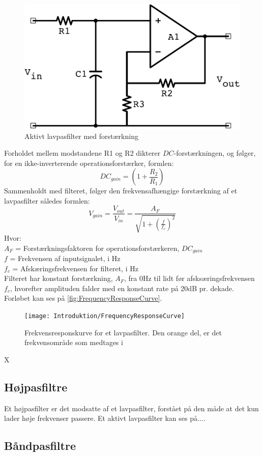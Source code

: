 %
\begin{figure}[H]
	\centering
	\includegraphics[resolution=300,scale=0.5]{Figure/Introduktion/ActiveLowPassGain.pdf}
	\caption{Aktivt lavpasfilter med forstærkning}
	\label{fig:ActiveLowPassGain}
\end{figure}
\noindent
%
Forholdet mellem modstandene R1 og R2 dikterer $DC$-forstærkningen, og følger, for en ikke-inverterende operationsforstærker, formlen:
%
\begin{equation} \label{eq:LowPassDCGain}
	DC_{gain}=\left(1+\frac{R_2}{R_1}\right)
\end{equation}
%
Sammenholdt med filteret, følger den frekvensafhængige forstærkning af et lavpasfilter således formlen:
%
\begin{equation} \label{LowPassFqVGain}
  V_{gain}=\frac{V_{out}}{V_{in}}=\frac{A_F}{\sqrt{1+\left(\frac{f}{f_c}\right)^2}}
\end{equation}
Hvor:\\
$A_F$ = Forstærkningsfaktoren for operationsforstærkeren, $DC_{gain}$\\
$f$ = Frekvensen af inputsignalet, i Hz\\
$f_c$ = Afskæringsfrekvensen for filteret, i Hz\\
Filteret har konstant forstærkning, $A_F$, fra 0Hz til lidt før afsksæringsfrekvensen $f_c$, hvorefter amplituden falder med en konstant rate på 20dB pr. dekade. Forløbet kan ses på \autoref{fig:FrequencyResponseCurve}.
%
\begin{figure}[H]
	\centering
	\texttt{[image: Introduktion/FrequencyResponseCurve]}
	\caption{Frekvensresponskurve for et lavpasfilter. Den orange del, er det frekvensområde som medtages i}
	\label{fig:FrequencyResponseCurve}
\end{figure}
\noindent
X
%
%
%
\subsection{Højpasfiltre}
\label{Hoejpasfiltre}
Et højpasfilter er det modsatte af et lavpasfilter, forstået på den måde at det kun lader høje frekvenser passere. Et aktivt lavpasfilter kan ses på....
%
%
%
\subsection{Båndpasfiltre}
\label{Baandpasfiltre}

%
%
